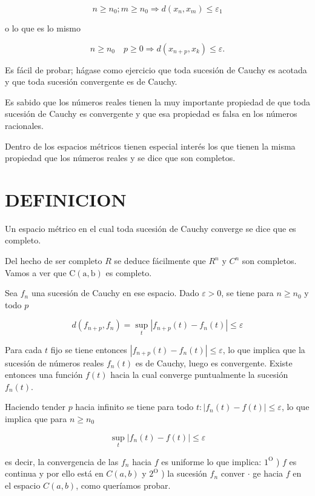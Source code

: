 \documentclass[10pt]{article}
\theoremstyle{plain}
\theoremstyle{definition}
\theoremstyle{remark}
\begin{document}
$$
n \geqslant n_{0} ; m \geqslant n_{0} \Rightarrow d\left(x_{n}, x_{m}\right) \leqslant \varepsilon_{1}
$$

o lo que es lo mismo


$$
n \geqslant n_{0} \quad p \geqslant 0 \Rightarrow d\left(x_{n+p}, x_{k}\right) \leqslant \varepsilon .
$$

Es fácil de probar; hágase como ejercicio que toda sucesión de Cauchy es acotada y que toda sucesión convergente es de Cauchy.

Es sabido que los números reales tienen la muy importante propiedad de que toda sucesión de Cauchy es convergente y que esa propiedad es falsa en los números racionales.

Dentro de los espacios métricos tienen especial interés los que tienen la misma propiedad que los números reales y se dice que son completos.

\section*{DEFINICION}
Un espacio métrico en el cual toda sucesión de Cauchy converge se dice que es completo.

Del hecho de ser completo $R$ se deduce fácilmente que $R^{n}$ y $C^{n}$ son completos. Vamos a ver que $\mathrm{C}(\mathrm{a}, \mathrm{b})$ es completo.

Sea $f_{n}$ una sucesión de Cauchy en ese espacio. Dado $\varepsilon>0$, se tiene para $n \geqslant n_{0}$ y todo $p$

$$
d\left(f_{n+p}, f_{n}\right)=\sup _{t}\left|f_{n+p}(t)-f_{n}(t)\right| \leqslant \varepsilon
$$

Para cada $t$ fijo se tiene entonces $\left|f_{n+p}(t)-f_{n}(t)\right| \leqslant \varepsilon$, lo que implica que la sucesión de números reales $f_{n}(t)$ es de Cauchy, luego es convergente. Existe entonces una función $f(t)$ hacia la cual converge puntualmente la sucesión $f_{n}(t)$.

Haciendo tender $p$ hacia infinito se tiene para todo $t:\left|f_{n}(t)-f(t)\right| \leqslant \varepsilon$, lo que implica que para $n \geqslant n_{0}$

$$
\sup _{t}\left|f_{n}(t)-f(t)\right| \leqslant \varepsilon
$$

es decir, la convergencia de las $f_{n}$ hacia $f$ es uniforme lo que implica: $1^{\mathrm{O}}$ ) $f$ es continua y por ello está en $C(a, b)$ y $2^{\mathrm{O}}$ ) la sucesión $f_{n}$ conver $\cdot$ ge hacia $f$ en el espacio $C(a, b)$, como queríamos probar.
\end{document}
